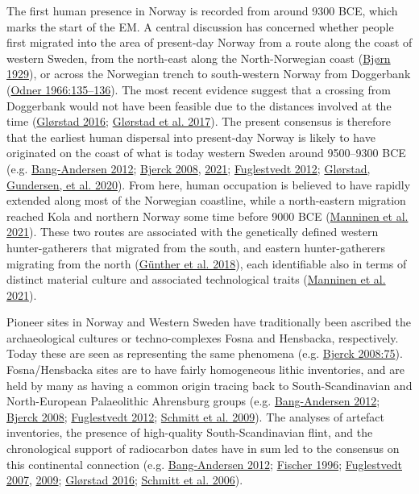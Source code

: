\documentclass[
  12pt,
  a4paper,
  oneside]{book}
\begin{document}
The first human presence in Norway is recorded from around 9300 BCE, which marks the start of the EM. A central discussion has concerned whether people first migrated into the area of present-day Norway from a route along the coast of western Sweden, from the north-east along the North-Norwegian coast (\protect\hyperlink{ref-bjuxf8rn1929}{Bjørn 1929}), or across the Norwegian trench to south-western Norway from Doggerbank (\protect\hyperlink{ref-odner1966}{Odner 1966:135--136}). The most recent evidence suggest that a crossing from Doggerbank would not have been feasible due to the distances involved at the time (\protect\hyperlink{ref-glorstad2016}{Glørstad 2016}; \protect\hyperlink{ref-glorstad2017}{Glørstad et al. 2017}). The present consensus is therefore that the earliest human dispersal into present-day Norway is likely to have originated on the coast of what is today western Sweden around 9500--9300 BCE (e.g. \protect\hyperlink{ref-bang-andersen2012}{Bang-Andersen 2012}; \protect\hyperlink{ref-bjerck2008}{Bjerck 2008}, \protect\hyperlink{ref-bjerck2021}{2021}; \protect\hyperlink{ref-fuglestvedt2012}{Fuglestvedt 2012}; \protect\hyperlink{ref-glorstad2020}{Glørstad, Gundersen, et al. 2020}). From here, human occupation is believed to have rapidly extended along most of the Norwegian coastline, while a north-eastern migration reached Kola and northern Norway some time before 9000 BCE (\protect\hyperlink{ref-manninen2021}{Manninen et al. 2021}). These two routes are associated with the genetically defined \textquotesingle western\textquotesingle{} hunter-gatherers that migrated from the south, and \textquotesingle eastern\textquotesingle{} hunter-gatherers migrating from the north (\protect\hyperlink{ref-gunther2018}{Günther et al. 2018}), each identifiable also in terms of distinct material culture and associated technological traits (\protect\hyperlink{ref-manninen2021}{Manninen et al. 2021}).

Pioneer sites in Norway and Western Sweden have traditionally been ascribed the archaeological cultures or techno-complexes Fosna and Hensbacka, respectively. Today these are seen as representing the same phenomena (e.g. \protect\hyperlink{ref-bjerck2008}{Bjerck 2008:75}). Fosna/Hensbacka sites are to have fairly homogeneous lithic inventories, and are held by many as having a common origin tracing back to South-Scandinavian and North-European Palaeolithic Ahrensburg groups (e.g. \protect\hyperlink{ref-bang-andersen2012}{Bang-Andersen 2012}; \protect\hyperlink{ref-bjerck2008}{Bjerck 2008}; \protect\hyperlink{ref-fuglestvedt2012}{Fuglestvedt 2012}; \protect\hyperlink{ref-schmitt2009}{Schmitt et al. 2009}). The analyses of artefact inventories, the presence of high-quality South-Scandinavian flint, and the chronological support of radiocarbon dates have in sum led to the consensus on this continental connection (e.g. \protect\hyperlink{ref-bang-andersen2012}{Bang-Andersen 2012}; \protect\hyperlink{ref-fischer1996}{Fischer 1996}; \protect\hyperlink{ref-fuglestvedt2007}{Fuglestvedt 2007}, \protect\hyperlink{ref-fuglestvedt2009}{2009}; \protect\hyperlink{ref-glorstad2016}{Glørstad 2016}; \protect\hyperlink{ref-schmitt2006}{Schmitt et al. 2006}).
\end{document}
